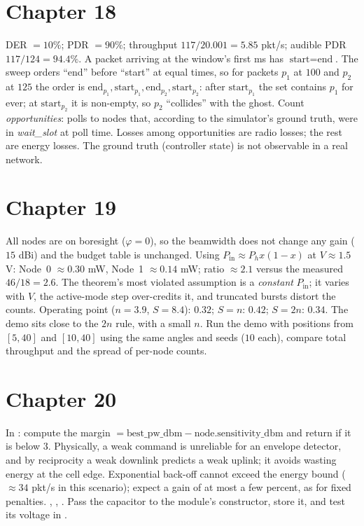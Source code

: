 \section*{Chapter 18}
 DER $=10\%$; PDR $=90\%$; throughput $117/20.001=5.85$ pkt/s; audible PDR $117/124=94.4\%$.
 A packet arriving at the window's first ms has $\text{start}=\text{end}$. The sweep orders ``end'' before ``start'' at equal times, so for packets $p_1$ at $100$ and $p_2$ at $125$ the order is $\text{end}_{p_1},\text{start}_{p_1},\text{end}_{p_2},\text{start}_{p_2}$: after $\text{start}_{p_1}$ the set  contains $p_1$ for ever; at $\text{start}_{p_2}$ it is non-empty, so $p_2$ ``collides'' with the ghost.
 Count \emph{opportunities}: polls to nodes that, according to the simulator's ground truth, were in \emph{wait\_slot} at poll time. Losses among opportunities are radio losses; the rest are energy losses. The ground truth (controller state) is not observable in a real network.

\section*{Chapter 19}
 All nodes are on boresight ($\varphi=0$), so the beamwidth does not change any gain ($15$ dBi) and the budget table is unchanged.
 Using $P_{\mathrm{in}}\approx P_hx(1-x)$ at $V\approx1.5$ V: Node~0 $\approx0.30$ mW, Node~1 $\approx0.14$ mW; ratio $\approx2.1$ versus the measured $46/18=2.6$. The theorem's most violated assumption is a \emph{constant} $P_{\mathrm{in}}$; it varies with $V$, the active-mode step over-credits it, and truncated bursts distort the counts.
 Operating point ($n=3.9$, $S=8.4$): $0.32$; $S=n$: $0.42$; $S=2n$: $0.34$. The demo sits close to the $2n$ rule, with a small $n$.
 Run the demo with positions from $[5,40]$ and $[10,40]$ using the same angles and seeds ($10$ each), compare total throughput and the spread of per-node counts.

\section*{Chapter 20}
 In : compute the margin $=\text{best\_pw\_dbm}-\text{node.sensitivity\_dbm}$ and return if it is below $3$. Physically, a weak command is unreliable for an envelope detector, and by reciprocity a weak downlink predicts a weak uplink; it avoids wasting energy at the cell edge.
 Exponential back-off cannot exceed the energy bound ($\approx34$ pkt/s in this scenario); expect a gain of at most a few percent, as for fixed penalties.
 , , .
 Pass the capacitor to the module's constructor, store it, and test its voltage in .

